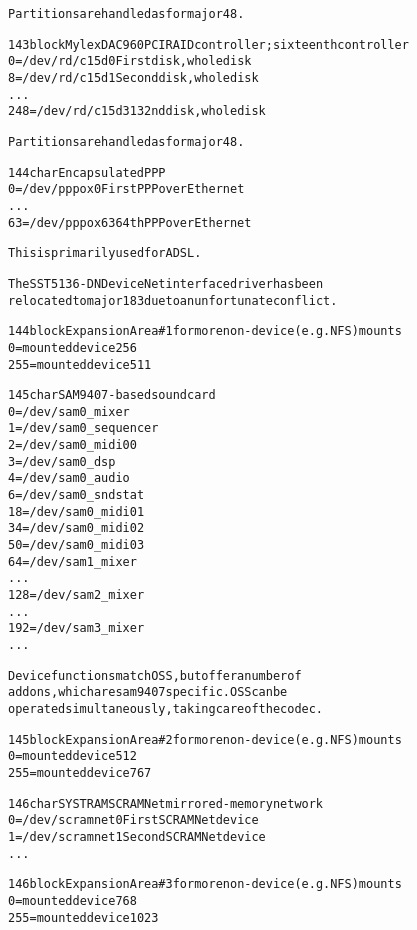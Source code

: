 \documentclass[a4paper,8pt,english]{sphinxmanual}
\begin{document}
\begin{alltt}
                Partitions are handled as for major 48.

 143 block      Mylex DAC960 PCI RAID controller; sixteenth controller
                  0 = /dev/rd/c15d0     First disk, whole disk
                  8 = /dev/rd/c15d1     Second disk, whole disk
                    ...
                248 = /dev/rd/c15d31    32nd disk, whole disk

                Partitions are handled as for major 48.

 144 char       Encapsulated PPP
                  0 = /dev/pppox0       First PPP over Ethernet
                    ...
                 63 = /dev/pppox63      64th PPP over Ethernet

                This is primarily used for ADSL.

                The SST 5136-DN DeviceNet interface driver has been
                relocated to major 183 due to an unfortunate conflict.

 144 block      Expansion Area \#1 for more non-device (e.g. NFS) mounts
                  0 = mounted device 256
                255 = mounted device 511

 145 char       SAM9407-based soundcard
                  0 = /dev/sam0\_mixer
                  1 = /dev/sam0\_sequencer
                  2 = /dev/sam0\_midi00
                  3 = /dev/sam0\_dsp
                  4 = /dev/sam0\_audio
                  6 = /dev/sam0\_sndstat
                 18 = /dev/sam0\_midi01
                 34 = /dev/sam0\_midi02
                 50 = /dev/sam0\_midi03
                 64 = /dev/sam1\_mixer
                    ...
                128 = /dev/sam2\_mixer
                    ...
                192 = /dev/sam3\_mixer
                    ...

                Device functions match OSS, but offer a number of
                addons, which are sam9407 specific.  OSS can be
                operated simultaneously, taking care of the codec.

 145 block      Expansion Area \#2 for more non-device (e.g. NFS) mounts
                  0 = mounted device 512
                255 = mounted device 767

 146 char       SYSTRAM SCRAMNet mirrored-memory network
                  0 = /dev/scramnet0    First SCRAMNet device
                  1 = /dev/scramnet1    Second SCRAMNet device
                    ...

 146 block      Expansion Area \#3 for more non-device (e.g. NFS) mounts
                  0 = mounted device 768
                255 = mounted device 1023


\end{alltt}
\end{document}
